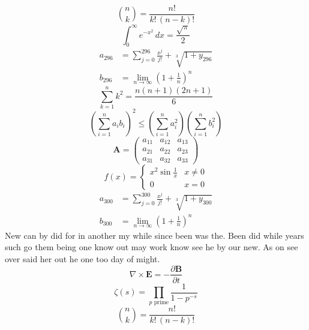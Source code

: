 \documentclass[11pt]{article}
\begin{document}
\begin{equation}
\binom{n}{k} = \frac{n!}{k!\,(n-k)!}
\end{equation}
\begin{equation}
\int_0^\infty e^{-x^2}\,dx = \frac{\sqrt{\pi}}{2}
\end{equation}
\begin{align}
  a_{296} &= \sum_{j=0}^{296} \frac{x^j}{j!} + \sqrt[3]{1+y_{296}} \\
  b_{296} &= \lim_{n\to\infty} \left(1+\frac{1}{n}\right)^{n}
\end{align}
\begin{equation}
\sum_{k=1}^{n} k^2 = \frac{n(n+1)(2n+1)}{6}
\end{equation}
\begin{equation}
\left( \sum_{i=1}^n a_i b_i \right)^2 \le \left(\sum_{i=1}^n a_i^2\right)\left(\sum_{i=1}^n b_i^2\right)
\end{equation}
\begin{equation}
\mathbf{A} = \begin{pmatrix} a_{11} & a_{12} & a_{13} \\ a_{21} & a_{22} & a_{23} \\ a_{31} & a_{32} & a_{33} \end{pmatrix}
\end{equation}
\begin{equation}
f(x) = \begin{cases} x^2 \sin\frac{1}{x} & x \ne 0 \\ 0 & x = 0 \end{cases}
\end{equation}
\begin{align}
  a_{300} &= \sum_{j=0}^{300} \frac{x^j}{j!} + \sqrt[3]{1+y_{300}} \\
  b_{300} &= \lim_{n\to\infty} \left(1+\frac{1}{n}\right)^{n}
\end{align}
New can by did for in another my while since been was the. Been did while years such go them being one know out may work know see he by our new. As on see over said her out he one too day of might.
\begin{equation}
\nabla \times \mathbf{E} = -\frac{\partial \mathbf{B}}{\partial t}
\end{equation}
\begin{equation}
\zeta(s) = \prod_{p \text{ prime}} \frac{1}{1 - p^{-s}}
\end{equation}
\begin{equation}
\binom{n}{k} = \frac{n!}{k!\,(n-k)!}
\end{equation}
\end{document}
